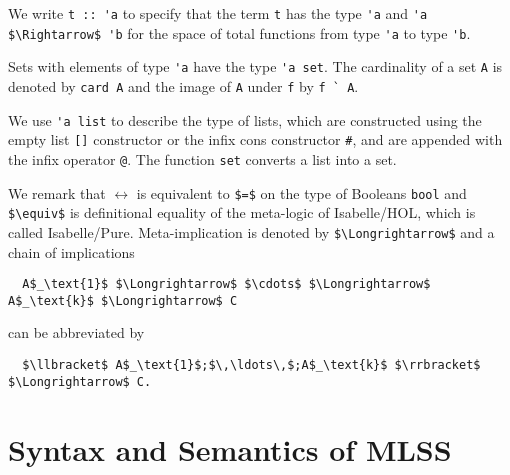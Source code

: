 \documentclass[sigplan,10pt,anonymous,review]{acmart}
\begin{document}
We write \lstinline!t :: 'a! to specify that the term \lstinline!t! has the type \lstinline!'a! and \lstinline!'a $\Rightarrow$ 'b! for the space of total functions from type \lstinline!'a! to type \lstinline!'b!.

Sets with elements of type \lstinline!'a! have the type \lstinline!'a set!.
The cardinality of a set \lstinline!A! is denoted by \lstinline!card A! and the image of \lstinline!A! under \lstinline!f! by \lstinline!f ` A!.

We use \lstinline!'a list! to describe the type of lists, which are constructed using the empty list \lstinline![]! constructor or the infix cons constructor \lstinline!#!, and are appended with the infix operator \lstinline!@!.
The function \lstinline!set! converts a list into a set.

We remark that $\longleftrightarrow$ is equivalent to \lstinline!$=$! on the type of Booleans \lstinline!bool! and \lstinline!$\equiv$! is definitional equality of the meta-logic of Isabelle/HOL, which is called Isabelle/Pure.
Meta-implication is denoted by \lstinline!$\Longrightarrow$! and a chain of implications
\begin{lstlisting}
  A$_\text{1}$ $\Longrightarrow$ $\cdots$ $\Longrightarrow$ A$_\text{k}$ $\Longrightarrow$ C
\end{lstlisting}
can be abbreviated by 
\begin{lstlisting}
  $\llbracket$ A$_\text{1}$;$\,\ldots\,$;A$_\text{k}$ $\rrbracket$ $\Longrightarrow$ C.
\end{lstlisting}

\section{Syntax and Semantics of MLSS\label{sec:semantics}}
\end{document}

